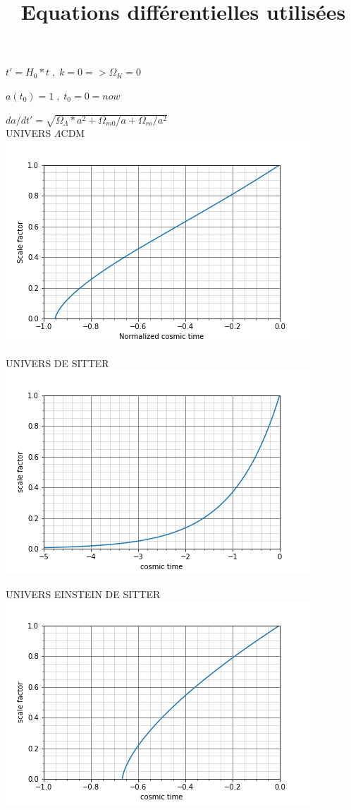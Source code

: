 \documentclass[12pt, a4paper]{article}
\date{}
\begin{document}
\title{Equations différentielles utilisées}
\maketitle

\smallskip

\Large $t' = H_0*t \;,\; k=0 => \Omega_K=0$

$ a(t_0)=1 \;,\; t_0 = 0 = now$ 

\medskip

$da/dt' = \sqrt{\Omega_{\Lambda}*a^2+\Omega_{m0}/a+\Omega_{ro}/a^2}$
\\

UNIVERS $\Lambda$CDM
\\
\includegraphics{Scale_factor}
\newpage

UNIVERS DE SITTER
\\
\includegraphics{DeSitter}

\newpage
UNIVERS EINSTEIN DE SITTER
\\
\includegraphics{EinsteinDeSitter}
\end{document}
